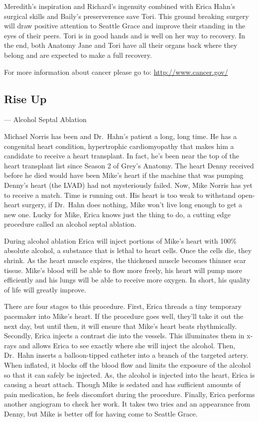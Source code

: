 \documentclass[12pt,a4paper,onecolumn]{article}
\begin{document}
Meredith's inspiration and Richard's ingenuity\cite{ingenuity} combined with Erica Hahn's surgical
skills and Baily's preserverence save Tori. This ground breaking surgery will draw positive
attention to Seattle Grace and improve their standing in the eyes of their peers. Tori is in good
hands and is well on her way to recovery. In the end, both Anatomy Jane and Tori have all their
organs back where they belong and are expected to make a full recovery.

For more information about cancer please go to: \url{http://www.cancer.gov/}

\subsection{Rise Up}
\begin{flushright} --- Alcohol Septal Ablation\cite{ablation}
\end{flushright}

Michael Norris has been and Dr.~Hahn's patient a long, long time. He has a
congenital\cite{congenital} heart condition, hypertrophic\cite{hypertrophic}
cardiomyopathy\cite{cardiomyopathy} that makes him a candidate to receive a heart transplant. In
fact, he's been near the top of the heart transplant list since Season 2 of Grey's Anatomy. The
heart Denny received before he died would have been Mike's heart if the machine that was pumping
Denny's heart (the LVAD) had not mysteriously failed. Now, Mike Norris has yet to receive a match.
Time is running out. His heart is too weak to withstand open-heart surgery, if Dr.~Hahn does
nothing, Mike won't live long enough to get a new one. Lucky for Mike, Erica knows just the thing to
do, a cutting edge procedure called an alcohol septal ablation.

During alcohol ablation Erica will inject portions of Mike's heart with 100\% absolute alcohol, a
substance that is lethal\cite{lethal} to heart cells. Once the cells die, they shrink. As the heart
muscle expires, the thickened muscle becomes thinner scar tissue. Mike's blood will be able to flow
more freely, his heart will pump more efficiently and his lungs will be able to receive more oxygen.
In short, his quality of life will greatly improve.

There are four stages to this procedure. First, Erica threads a tiny temporary pacemaker into Mike's
heart. If the procedure goes well, they'll take it out the next day, but until then, it will ensure
that Mike's heart beats rhythmically. Secondly, Erica injects a contrast die into the vessels. This
illuminates them in x-rays and allows Erica to see exactly where she will inject the alcohol. Then,
Dr.~Hahn inserts a balloon-tipped catheter into a branch of the targeted artery. When inflated, it
blocks off the blood flow and limits the exposure of the alcohol so that it can safely be injected.
As, the alcohol is injected into the heart, Erica is causing a heart attach. Though Mike is sedated
and has sufficient amounts of pain medication, he feels discomfort during the procedure. Finally,
Erica performs another angiogram to check her work. It takes two tries and an appearance from Denny,
but Mike is better off for having come to Seattle Grace.
\end{document}
